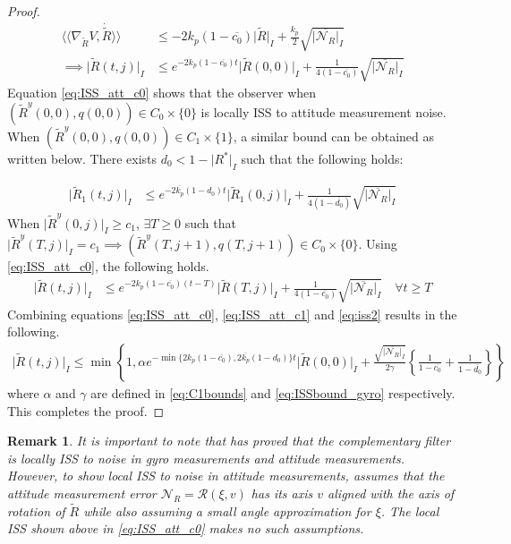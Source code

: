 \documentclass{article}
\newtheorem{remark}{Remark}
\newcommand{\Rtilde}{\tilde{R}}
\newcommand{\normSOthree}[1]{{{\vert}#1 {\vert}_I}}
\newcommand{\expo}[1]{e^{#1}}
\newcommand{\Rstar}{{R^*}}
\newcommand{\noiseatt}{\mathcal{N}_R}
\newcommand{\maxnoiseatt}{\normSOthree{\overline{\noiseatt}}}
\newcommand{\dualpairing}[2]{\langle\langle #1 , #2 \rangle\rangle}
\newcommand{\grad}[2]{\nabla_{#1}{#2}}
\newcommand{\cobar}{\overline{c_0}}
\begin{document}
\begin{proof}
\begin{align}
    \dualpairing{\grad{\Rtilde}{V}}{\dot\Rtilde} &\leq -2k_p(1-\cobar)\normSOthree{\Rtilde} + \frac{k_p}{{2}}\sqrt{\maxnoiseatt} \nonumber\\
    \implies \normSOthree{\Rtilde(t,j)} &\leq \expo{-2k_p(1-\cobar)t}\normSOthree{\Rtilde(0,0)} + \frac{1}{4 (1-\cobar)} \sqrt{\maxnoiseatt} \label{eq:ISS_att_c0}
\end{align}
Equation \eqref{eq:ISS_att_c0} shows that the observer when ${(\Rtilde^y(0,0), q(0,0))} \in C_0\times\{0\}$ is locally ISS to attitude measurement noise. When ${(\Rtilde^y(0,0), q(0,0))}\in C_1\times\{1\}$, a similar bound can be obtained as written below. {There exists ${d_0} < 1 - \normSOthree{\Rstar}$} such that the following holds:

\begin{align}\label{eq:ISS_att_c1}
    \normSOthree{\Rtilde_1(t,j)} &\leq \expo{-2\overline{k_p}(1-{d_0})t}\normSOthree{\Rtilde_1(0,j)} + \frac{1}{4 (1-\overline{d_0})} \sqrt{\maxnoiseatt}
\end{align}
When $\normSOthree{\Rtilde^y(0,j)}\geq {c_1}$, $\exists T \geq 0$ such that $\normSOthree{\Rtilde^y(T,j)} = {c_1} \implies {(\Rtilde^y(T,j+1), q(T,j+1))\in C_0\times\{0\}}$. Using \eqref{eq:ISS_att_c0}, the following holds.
\begin{align}
    \normSOthree{\Rtilde(t,j)} &\leq \expo{-2k_p(1-\cobar)(t-T)}\normSOthree{\Rtilde(T,j)} + \frac{1}{4 (1-\cobar)} \sqrt{\maxnoiseatt} \quad \forall t \geq T\label{eq:iss2}
\end{align}
Combining equations \eqref{eq:ISS_att_c0}, \eqref{eq:ISS_att_c1} and \eqref{eq:iss2} results in the following.
\begin{align}
    \normSOthree{\Rtilde(t,j)} \leq \min\left\{ 1, \alpha\expo{-\min\{2k_p(1-\cobar), 2\overline{k_p}(1-{d_0})\}t}\normSOthree{\Rtilde(0,0)} + \frac{\sqrt{\maxnoiseatt}}{2\gamma}\left\{\frac{1}{1-\cobar}+\frac{1}{1-\overline{d_0}}\right\}\right\}
\end{align}
where $\alpha$ and $\gamma$ are defined in \eqref{eq:C1bounds} and \eqref{eq:ISSbound_gyro} respectively. This completes the proof. 
\end{proof}

\begin{remark}
    It is important to note that \cite{berkane_complementary} has proved that the complementary filter is locally ISS to noise in gyro measurements and attitude measurements. However, to show local ISS to noise in attitude measurements, \cite{berkane_complementary} assumes that the attitude measurement error $\noiseatt = \mathcal{R}(\xi, v)$ has its axis $v$ aligned with the axis of rotation of $\Rtilde$ while also assuming a small angle approximation for $\xi$. The local ISS shown above in \eqref{eq:ISS_att_c0} makes no such assumptions. 
\end{remark}
\end{document}
